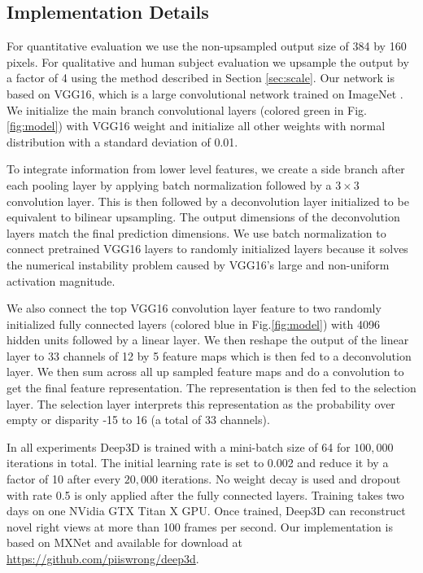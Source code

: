 \documentclass[runningheads]{llncs}
\begin{document}
\subsection{Implementation Details}
For quantitative evaluation we use the non-upsampled output size of 384 by 160 pixels.
For qualitative and human subject evaluation we upsample the output by a factor of 4 using the method described in Section \ref{sec:scale}.
Our network is based on VGG16, which is a large convolutional network trained on ImageNet \cite{simonyan2014very}.
We initialize the main branch convolutional layers (colored green in Fig.\ref{fig:model}) with VGG16 weight and initialize all other weights with normal distribution with a standard deviation of 0.01.

To integrate information from lower level features, we create a side branch after each pooling layer by applying batch normalization \cite{ioffe2015batch} followed by a $3 \times 3$ convolution layer. This is then followed by a deconvolution layer initialized to be equivalent to bilinear upsampling.
The output dimensions of the deconvolution layers match the final prediction dimensions.
We use batch normalization to connect pretrained VGG16 layers to randomly initialized layers because it solves the numerical instability problem caused by VGG16's large and non-uniform activation magnitude.

We also connect the top VGG16 convolution layer feature to two randomly initialized fully connected layers (colored blue in Fig.\ref{fig:model}) with 4096 hidden units followed by a linear layer.
We then reshape the output of the linear layer to 33 channels of 12 by 5 feature maps which is then fed to a deconvolution layer.
We then sum across all up sampled feature maps and do a convolution to get the final feature representation.
The representation is then fed to the selection layer.
The selection layer interprets this representation as the probability over empty or disparity -15 to 16 (a total of 33 channels).

In all experiments Deep3D is trained with a mini-batch size of 64 for $100,000$ iterations in total.
The initial learning rate is set to 0.002 and reduce it by a factor of 10 after every $20,000$ iterations.
No weight decay is used
and dropout with rate 0.5 is only applied after the fully connected layers.
Training takes two days on one NVidia GTX Titan X GPU.
Once trained, Deep3D can reconstruct novel right views at more than 100 frames per second.
Our implementation is based on MXNet \cite{chen2015mxnet} and available for download at \url{https://github.com/piiswrong/deep3d}.
\end{document}
